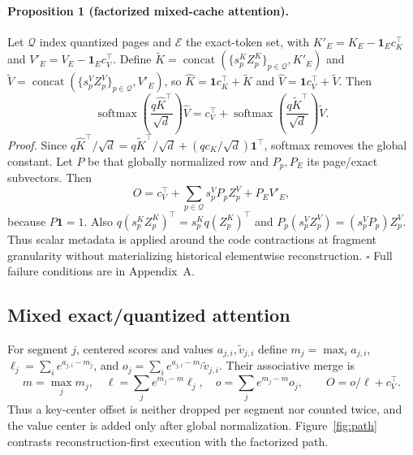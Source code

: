 \documentclass{article}
\newcommand{\Q}{\mathcal{Q}}
\newcommand{\E}{\mathcal{E}}
\begin{document}
\paragraph{Proposition 1 (factorized mixed-cache attention).}
Let $\Q$ index quantized pages and $\E$ the exact-token set, with
$K'_E=K_E-\mathbf1_Ec_K^\top$ and $V'_E=V_E-\mathbf1_Ec_V^\top$.  Define
$\widetilde K=\operatorname{concat}(\{s_p^KZ_p^K\}_{p\in\Q},K'_E)$ and
$\widetilde V=\operatorname{concat}(\{s_p^VZ_p^V\}_{p\in\Q},V'_E)$, so
$\widehat K=\mathbf1c_K^\top+\widetilde K$ and
$\widehat V=\mathbf1c_V^\top+\widetilde V$.  Then
\begin{equation}
 \operatorname{softmax}\!\left(\frac{q\widehat K^\top}{\sqrt d}\right)\widehat V
 =c_V^\top+\operatorname{softmax}\!\left(
 \frac{q\widetilde K^\top}{\sqrt d}\right)\widetilde V.    \label{eq:factorized}
\end{equation}
\emph{Proof.}  Since $q\widehat K^\top/\sqrt d=q\widetilde K^\top/\sqrt d+
(qc_K/\sqrt d)\mathbf1^\top$, softmax removes the global constant.  Let $P$
be that globally normalized row and $P_p,P_E$ its page/exact subvectors.  Then
\begin{equation}
 O=c_V^\top+\sum_{p\in\Q}s_p^VP_pZ_p^V+P_EV'_E,             \label{eq:value}
\end{equation}
because $P\mathbf1=1$.  Also
$q(s_p^KZ_p^K)^\top=s_p^Kq(Z_p^K)^\top$ and
$P_p(s_p^VZ_p^V)=(s_p^VP_p)Z_p^V$.  Thus scalar metadata is applied around the
code contractions at fragment granularity without materializing historical
elementwise reconstruction. $\square$  Full failure conditions are in Appendix~A.

\subsection{Mixed exact/quantized attention}

For segment $j$, centered scores and values $a_{j,i},\widetilde v_{j,i}$ define
$m_j=\max_i a_{j,i}$, $\ell_j=\sum_i e^{a_{j,i}-m_j}$, and
$o_j=\sum_i e^{a_{j,i}-m_j}\widetilde v_{j,i}$.  Their associative merge is
\begin{equation}
 m=\max_jm_j,\quad \ell=\sum_j e^{m_j-m}\ell_j,\quad
 o=\sum_j e^{m_j-m}o_j,\qquad O=o/\ell+c_V^\top.            \label{eq:merge}
\end{equation}
Thus a key-center offset is neither dropped per segment nor counted twice, and
the value center is added only after global normalization.  Figure~\ref{fig:path}
contrasts reconstruction-first execution with the factorized path.
\end{document}
